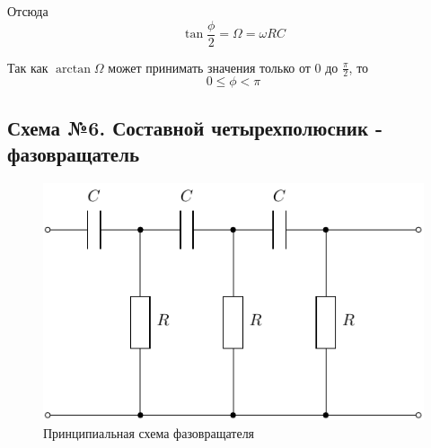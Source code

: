 Отсюда
\begin{equation}
	\tan\frac{\phi}{2}=\Omega = \omega RC
\end{equation}

Так как $\arctan\Omega$ может принимать значения только от 0 до $\frac{\pi}2$, то 
\begin{equation}
	0\leq\phi<\pi
\end{equation}

\subsection{Схема №6. Составной четырехполюсник - фазовращатель}

\begin{figure}[H]
	\centering
	\includegraphics[]{chems/chem6}
	\caption{Принципиальная схема фазовращателя}
	\label{fig:ph_rot2}
\end{figure}


